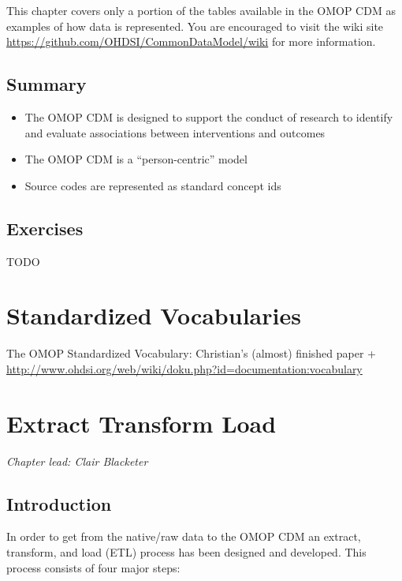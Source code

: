 \documentclass[11pt]{book}
\theoremstyle{definition}
\theoremstyle{definition}
\theoremstyle{definition}
\theoremstyle{remark}
\let\BeginKnitrBlock\begin \let\EndKnitrBlock\end
\begin{document}
This chapter covers only a portion of the tables available in the OMOP CDM as examples of how data is represented. You are encouraged to visit the wiki site \url{https://github.com/OHDSI/CommonDataModel/wiki} for more information.

\hypertarget{summary-1}{%
\section{Summary}\label{summary-1}}

\BeginKnitrBlock{rmdsummary}
\begin{itemize}
\item
  The OMOP CDM is designed to support the conduct of research to identify and evaluate associations between interventions and outcomes
\item
  The OMOP CDM is a ``person-centric'' model
\item
  Source codes are represented as standard concept ids
\end{itemize}
\EndKnitrBlock{rmdsummary}

\hypertarget{exercises}{%
\section{Exercises}\label{exercises}}

TODO

\hypertarget{StandardizedVocabularies}{%
\chapter{Standardized Vocabularies}\label{StandardizedVocabularies}}

The OMOP Standardized Vocabulary: Christian's (almost) finished paper + \url{http://www.ohdsi.org/web/wiki/doku.php?id=documentation:vocabulary}

\hypertarget{ExtractTransformLoad}{%
\chapter{Extract Transform Load}\label{ExtractTransformLoad}}

\emph{Chapter lead: Clair Blacketer}

\hypertarget{introduction}{%
\section{Introduction}\label{introduction}}

In order to get from the native/raw data to the OMOP CDM an extract, transform, and load (ETL) process has been designed and developed. This process consists of four major steps:
\end{document}
